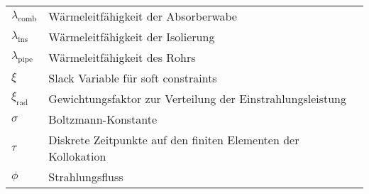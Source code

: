 \begin{table}[ht!]
\begin{tabular}{m{}m{}}
        $\lambda_{\mathrm{comb}}$               & Wärmeleitfähigkeit der Absorberwabe                           \\
        $\lambda_{\mathrm{ins}}$                & Wärmeleitfähigkeit der Isolierung                             \\
        $\lambda_{\mathrm{pipe}}$               & Wärmeleitfähigkeit des Rohrs                                  \\
        $\xi$                                   & Slack Variable für soft constraints                           \\
        $\xi_{\mathrm{rad}}$                    & Gewichtungsfaktor zur Verteilung der Einstrahlungsleistung    \\
        $\sigma$                                & Boltzmann-Konstante                                           \\
        $\tau$                                  & Diskrete Zeitpunkte auf den finiten Elementen der Kollokation \\
        $\phi$                                  & Strahlungsfluss                                               \\
    \end{tabular}
\end{table}
\clearpage
\newpage \vspace*{-1cm}

\renewcommand{\arraystretch}{0.93}
